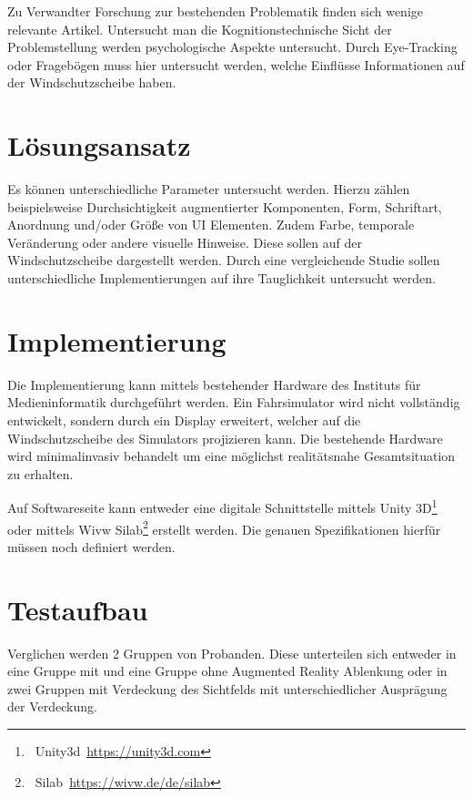 \documentclass[a4paper, 11pt]{article}
\begin{document}
Zu Verwandter Forschung zur bestehenden Problematik finden sich wenige relevante Artikel. Untersucht man die Kognitionstechnische Sicht der Problemstellung werden psychologische Aspekte untersucht. Durch Eye-Tracking oder Fragebögen muss hier untersucht werden, welche Einflüsse Informationen auf der Windschutzscheibe haben.

\section*{Lösungsansatz}
Es können unterschiedliche Parameter untersucht werden. Hierzu zählen beispielsweise Durchsichtigkeit augmentierter Komponenten, Form, Schriftart,  Anordnung und/oder Größe von UI Elementen. Zudem Farbe, temporale Veränderung oder andere visuelle Hinweise. Diese sollen auf der Windschutzscheibe dargestellt werden. Durch eine vergleichende Studie sollen unterschiedliche Implementierungen auf ihre Tauglichkeit untersucht werden. 

\section*{Implementierung}
Die Implementierung kann mittels bestehender Hardware des Instituts für Medieninformatik durchgeführt werden. Ein Fahrsimulator wird nicht vollständig entwickelt, sondern durch ein Display erweitert, welcher auf die Windschutzscheibe des Simulators projizieren kann. Die bestehende Hardware wird minimalinvasiv behandelt um eine möglichst realitätsnahe Gesamtsituation zu erhalten. 

Auf Softwareseite kann entweder eine digitale Schnittstelle mittels Unity 3D\footnote{~Unity3d~\url{https://unity3d.com}} oder mittels Wivw Silab\footnote{~Silab~\url{https://wivw.de/de/silab}} erstellt werden. Die genauen Spezifikationen hierfür müssen noch definiert werden.

\section*{Testaufbau}
Verglichen werden 2 Gruppen von Probanden. Diese unterteilen sich entweder in eine Gruppe mit und eine Gruppe ohne Augmented Reality Ablenkung oder in zwei Gruppen mit Verdeckung des Sichtfelds mit unterschiedlicher Ausprägung der Verdeckung.
\end{document}
